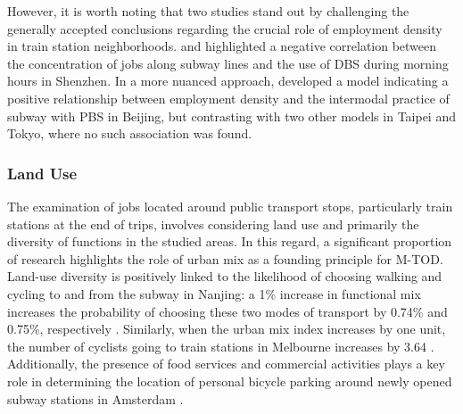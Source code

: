 \begin{refsegment}
However, it is worth noting that two studies stand out by challenging the generally accepted conclusions regarding the crucial role of employment density in train station neighborhoods. \textcolor{blue}{\textcite[10]{guo_built_2020}} and \textcolor{blue}{\textcite[389]{guo_role_2021}} highlighted a negative correlation between the concentration of jobs along subway lines and the use of \acrshort{DBS} during morning hours in Shenzhen. In a more nuanced approach, \textcolor{blue}{\textcite[214]{lin_built_2018}} developed a model indicating a positive relationship between employment density and the intermodal practice of subway with \acrshort{PBS} in Beijing, but contrasting with two other models in Taipei and Tokyo, where no such association was found.%

\subsubsection*{Land Use
    \label{chap2:occupation-sols}
    }

The examination of jobs located around public transport stops, particularly train stations at the  end of trips, involves considering land use and primarily the diversity of functions in the studied areas. In this regard, a significant proportion of research highlights the role of urban mix as a founding principle for \acrshort{M-TOD}. Land-use diversity is positively linked to the likelihood of choosing walking and cycling to and from the subway in Nanjing: a 1\% increase in functional mix increases the probability of choosing these two modes of transport by 0.74\% and 0.75\%, respectively \textcolor{blue}{\autocite[182]{gan_associations_2021}}. Similarly, when the urban mix index increases by one unit, the number of cyclists going to train stations in Melbourne increases by 3.64 \textcolor{blue}{\autocite[401]{weliwitiya_bicycle_2019}}. Additionally, the presence of food services and commercial activities plays a key role in determining the location of personal bicycle parking around newly opened subway stations in Amsterdam \textcolor{blue}{\autocite[343]{kampen_bicycle_2021}}.%


\end{refsegment}
